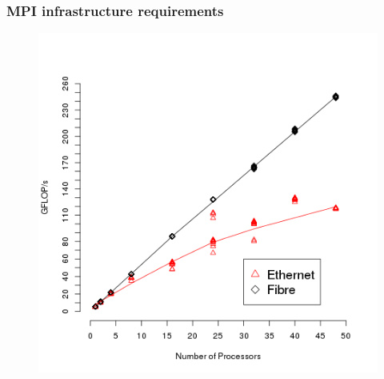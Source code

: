 \begin{frame}
		\frametitle{MPI infrastructure requirements}
		\begin{figure}
				\includegraphics[width=0.65\linewidth]{figures/diagrams/connection/connection}
		\end{figure}
\end{frame}


